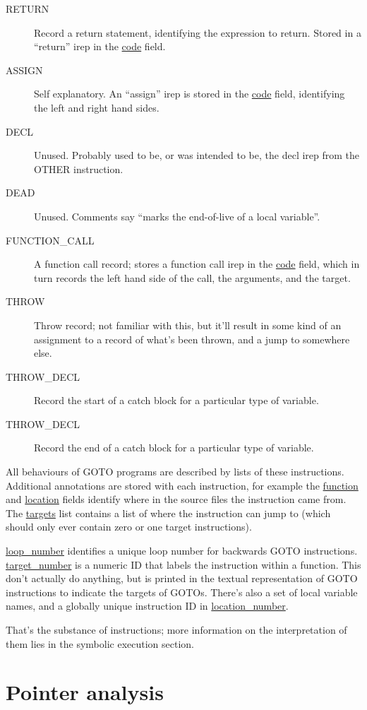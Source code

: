 \documentclass{article}
\begin{document}
\begin{description}
\item[RETURN] Record a return statement, identifying the expression to return.
Stored in a ``return'' irep in the \url{code} field.
\item[ASSIGN] Self explanatory. An ``assign'' irep is stored in the
\url{code} field, identifying the left and right hand sides.
\item[DECL] Unused. Probably used to be, or was intended to be, the decl
irep from the OTHER instruction.
\item[DEAD] Unused. Comments say ``marks the end-of-live of a local variable''.
\item[FUNCTION\_CALL] A function call record; stores a function call irep in
the \url{code} field, which in turn records the left hand side of the call,
the arguments, and the target.
\item[THROW] Throw record; not familiar with this, but it'll result in some
kind of an assignment to a record of what's been thrown, and a jump to somewhere
else.
\item[THROW\_DECL] Record the start of a catch block for a particular type
of variable.
\item[THROW\_DECL] Record the end of a catch block for a particular type
of variable.
\end{description}

All behaviours of GOTO programs are described by lists of these instructions.
Additional annotations are stored with each instruction, for example the
\url{function} and \url{location} fields identify where in the source
files the instruction came from. The \url{targets} list contains a list
of where the instruction can jump to (which should only ever contain zero or
one target instructions).

\url{loop_number} identifies a unique loop number for backwards
GOTO instructions. \url{target_number} is a numeric ID that labels
the instruction within a function. This don't actually do anything, but
is printed in the textual representation of GOTO instructions to indicate
the targets of GOTOs.  There's also a set of local variable names, and
a globally unique instruction ID in \url{location_number}.

That's the substance of instructions; more information on the interpretation
of them lies in the symbolic execution section.

\section{Pointer analysis}
\end{document}

